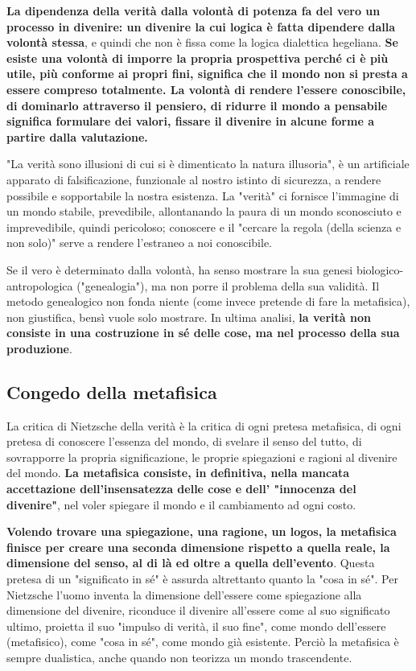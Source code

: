 \textbf{La dipendenza della verità dalla volontà di potenza fa del vero un processo in divenire: un divenire la cui logica è fatta dipendere dalla volontà stessa}, e quindi che non è fissa come la logica dialettica hegeliana. \textbf{Se esiste una volontà di imporre la propria prospettiva perché ci è più utile, più conforme ai propri fini, significa che il mondo non si presta  a essere compreso totalmente. La volontà di rendere l'essere conoscibile, di dominarlo attraverso il pensiero, di ridurre il mondo a pensabile significa formulare dei valori, fissare il divenire in alcune forme a partire dalla valutazione.}

"La verità sono illusioni di cui si è dimenticato la natura illusoria", è un artificiale apparato di falsificazione, funzionale al nostro istinto di sicurezza, a rendere possibile e sopportabile la nostra esistenza. La "verità" ci fornisce l'immagine di un mondo stabile, prevedibile, allontanando la paura di un mondo sconosciuto e imprevedibile, quindi pericoloso; conoscere e il "cercare la regola (della scienza e non solo)" serve a rendere l'estraneo a noi conoscibile.

Se il vero è determinato dalla volontà, ha senso mostrare la sua genesi biologico-antropologica ("genealogia"), ma non porre il problema della sua validità. Il metodo genealogico non fonda niente (come invece pretende di fare la metafisica), non giustifica, bensì vuole solo mostrare. In ultima analisi, \textbf{la verità non consiste in una costruzione in sé delle cose, ma nel processo della sua produzione}.

\subsection{Congedo della metafisica}

La critica di Nietzsche della verità è la critica di ogni pretesa metafisica, di ogni pretesa di conoscere l'essenza del mondo, di svelare il senso del tutto, di sovrapporre la propria significazione, le proprie spiegazioni  e ragioni al divenire del mondo. \textbf{La metafisica consiste, in definitiva, nella mancata accettazione dell'insensatezza delle cose e dell' "innocenza del divenire"}, nel voler spiegare il mondo e il cambiamento ad ogni costo.

\textbf{Volendo trovare una spiegazione, una ragione, un logos, la metafisica finisce per creare una seconda dimensione rispetto a quella reale, la dimensione del senso, al di là ed oltre a quella dell'evento}. Questa pretesa di un "significato in sé" è assurda altrettanto quanto la "cosa in sé". Per Nietzsche l'uomo inventa la dimensione dell'essere come spiegazione alla dimensione del divenire, riconduce il divenire all'essere come al suo significato ultimo, proietta il suo "impulso di verità, il suo fine", come mondo dell'essere (metafisico), come "cosa in sé", come mondo già esistente. Perciò la metafisica è sempre dualistica, anche quando non teorizza un mondo trascendente.

